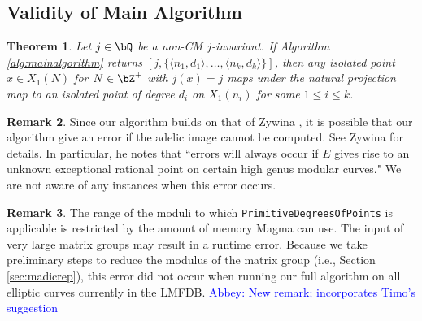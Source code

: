 \documentclass[11pt,reqno]{amsart}
\theoremstyle{plain}
\newtheorem{theorem}{Theorem}%
\theoremstyle{definition}
\newtheorem{remark}[theorem]{Remark}
\newcommand{\Q}{\bQ}
\newcommand{\Z}{\bZ}
\newcommand{\abbey}[1]{\textcolor{blue}{Abbey: #1}}
\begin{document}
\subsection{Validity of Main Algorithm}
\label{sec:proofvalidity}
\begin{theorem}\label{thm:validity_main_algorithm}
Let $j\in\Q$ be a non-CM $j$-invariant. If Algorithm \ref{alg:mainalgorithm} returns $[j,\{\langle n_1,d_1\rangle, \dots, \langle n_k,d_k\rangle \}]$, then any isolated point $x\in X_1(N)$ for $N \in \Z^+$ with $j(x)=j$ maps under the natural projection map to an isolated point of degree $d_i$ on $X_1(n_i)$ for some  $1 \leq i \leq k$.
\end{theorem}

\begin{remark}
Since our algorithm builds on that of Zywina \cite{ZywinaAlgorithm}, it is possible that our algorithm give an error if the adelic image cannot be computed. See Zywina \cite{ZywinaImagesGit} for details. In particular, he notes that ``errors will always occur if $E$ gives rise to an unknown exceptional rational point on certain high genus modular curves." We are not aware of any instances when this error occurs.
\end{remark}

\begin{remark} 
The range of the moduli to which \texttt{PrimitiveDegreesOfPoints} is applicable is restricted by the amount of memory Magma can use. The input of very large matrix groups may result in a runtime error. Because we take preliminary steps to reduce the modulus of the matrix group (i.e., Section \ref{sec:madicrep}), this error did not occur when running our full algorithm on all elliptic curves currently in the LMFDB. \abbey{New remark; incorporates Timo's suggestion}
\end{remark}
\end{document}
